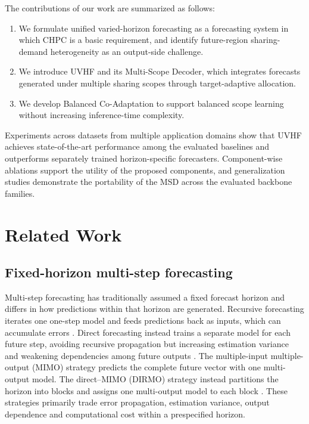 \documentclass[final,3p,times]{elsarticle}
\newif\ifshowrevisions
\newcommand{\rev}[1]{\ifshowrevisions\textcolor{revisionblue}{#1}\else#1\fi}
\begin{document}
The contributions of our work are summarized as follows:

\begin{enumerate}
\item We formulate \rev{unified varied-horizon forecasting} as a forecasting system in which CHPC is a basic requirement, and identify future-region sharing-demand heterogeneity as an output-side challenge.
\item We introduce \rev{UVHF and its Multi-Scope Decoder}, which integrates forecasts generated under multiple sharing scopes through target-adaptive allocation.
\item We develop \rev{Balanced Co-Adaptation} to support balanced scope learning without increasing inference-time complexity.
\end{enumerate}

Experiments across datasets from multiple application domains show that \rev{UVHF} achieves state-of-the-art performance among the evaluated baselines and outperforms separately trained horizon-specific forecasters. Component-wise ablations support the utility of the proposed components, and generalization studies demonstrate \rev{the portability of the MSD} across the evaluated backbone families.

\section{Related Work}
\label{sec:related-work}


\subsection{Fixed-horizon multi-step forecasting}


Multi-step forecasting has traditionally assumed a fixed forecast horizon and differs in how predictions within that horizon are generated. Recursive forecasting iterates one one-step model and feeds predictions back as inputs, which can accumulate errors \citep{taieb2014boosting}. Direct forecasting instead trains a separate model for each future step, avoiding recursive propagation but increasing estimation variance and weakening dependencies among future outputs \citep{taieb2014boosting}. The multiple-input multiple-output (MIMO) strategy predicts the complete future vector with one multi-output model. The direct--MIMO (DIRMO) strategy instead partitions the horizon into blocks and assigns one multi-output model to each block \citep{bontempi2008mimo,taieb2012review,green2025stratify}. These strategies primarily trade error propagation, estimation variance, output dependence and computational cost within a prespecified horizon.
\end{document}
